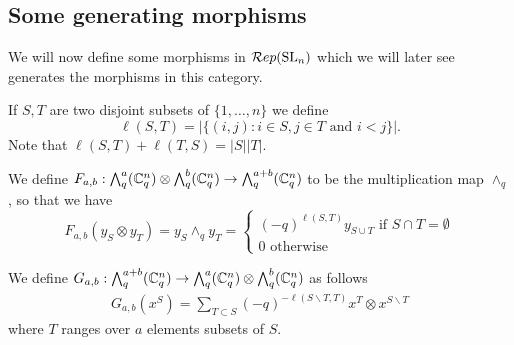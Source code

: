 \documentclass[10pt,leqno]{article}
\begin{document}
\subsection{Some generating morphisms}
We will now define some morphisms in $ \mathcal{R}ep({\rm{SL}}_n) $ which we will later see generates the morphisms in this category.

If $ S, T $ are two disjoint subsets of $ \{1, \dots, n\} $ we define $$ \ell(S, T) = |\{ (i,j) : i \in S, j \in T \text{ and } i < j \}|. $$ Note that $\ell(S,T) + \ell(T,S) = |S||T| $.

We define $ F_{a,b} : \bigwedge^a_q ({\mathbb{C}}^n_q) \otimes \bigwedge^b_q({\mathbb{C}}^n_q) \rightarrow \bigwedge^{a+b}_q({\mathbb{C}}^n_q) $ to be the 
multiplication map $ \wedge_q $, so that we have
\begin{equation*}
F_{a,b}(y_S \otimes y_T) = y_S \wedge_q y_T = \begin{cases} (-q)^{\ell(S, T)} y_{S \cup T} \text{ if $S \cap T = \emptyset$} \\
 0 \text{ otherwise}
 \end{cases} 
\end{equation*}

We define $ G_{a,b} :\bigwedge^{a+b}_q({\mathbb{C}}^n_q) \rightarrow \bigwedge^a_q ({\mathbb{C}}^n_q) \otimes \bigwedge^b_q({\mathbb{C}}^n_q) $ as follows 
\begin{align*}
G_{a,b}(x^S) = \sum_{T \subset S} (-q)^{-\ell(S \smallsetminus T, T)} x^T \otimes x^{S \smallsetminus T}
\end{align*}
where $ T $ ranges over $ a $ elements subsets of $ S $.



\end{document}
